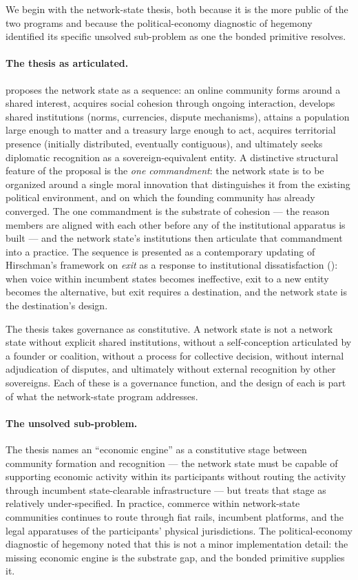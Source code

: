 \documentclass[11pt,a4paper]{article}
\theoremstyle{remark}
\begin{document}
We begin with the network-state thesis, both because it is the
more public of the two programs and because the political-economy
diagnostic of hegemony identified its specific unsolved
sub-problem as one the bonded primitive resolves.

\paragraph{The thesis as articulated.}
\citet{srinivasan2022network} proposes the network state as a
sequence: an online community forms around a shared interest,
acquires social cohesion through ongoing interaction, develops
shared institutions (norms, currencies, dispute mechanisms),
attains a population large enough to matter and a treasury
large enough to act, acquires territorial presence (initially
distributed, eventually contiguous), and ultimately seeks
diplomatic recognition as a sovereign-equivalent entity. A
distinctive structural feature of the proposal is the
\emph{one commandment}: the network state is to be organized
around a single moral innovation that distinguishes it from the
existing political environment, and on which the founding
community has already converged. The one commandment is the
substrate of cohesion --- the reason members are aligned with
each other before any of the institutional apparatus is built ---
and the network state's institutions then articulate that
commandment into a practice. The sequence is presented as a
contemporary updating of Hirschman's framework on \emph{exit} as
a response to institutional dissatisfaction
(\citealt{hirschman1970exit}): when voice within incumbent states
becomes ineffective, exit to a new entity becomes the alternative,
but exit requires a destination, and the network state is the
destination's design.

The thesis takes governance as constitutive. A network state is
not a network state without explicit shared institutions,
without a self-conception articulated by a founder or coalition,
without a process for collective decision, without internal
adjudication of disputes, and ultimately without external
recognition by other sovereigns. Each of these is a governance
function, and the design of each is part of what the
network-state program addresses.

\paragraph{The unsolved sub-problem.}
The thesis names an ``economic engine'' as a constitutive stage
between community formation and recognition --- the network state
must be capable of supporting economic activity within its
participants without routing the activity through incumbent
state-clearable infrastructure --- but treats that stage as
relatively under-specified. In practice, commerce within
network-state communities continues to route through fiat rails,
incumbent platforms, and the legal apparatuses of the
participants' physical jurisdictions. The political-economy
diagnostic of hegemony noted that this is not a minor
implementation detail: the missing economic engine is the
substrate gap, and the bonded primitive supplies it.
\end{document}
